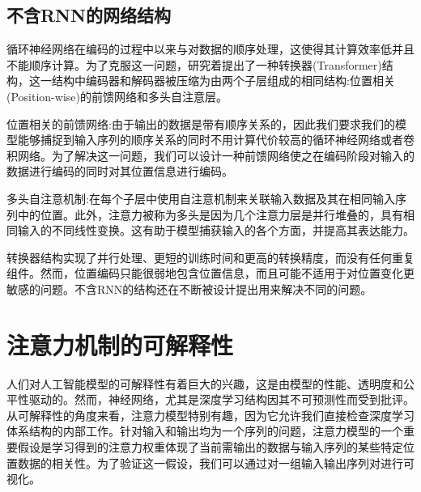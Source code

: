 \documentclass{ctexart}
\begin{document}
\subsection{不含RNN的网络结构}
循环神经网络在编码的过程中以来与对数据的顺序处理，这使得其计算效率低并且不能顺序计算。为了克服这一问题，研究着提出了一种转换器(Transformer)结构，这一结构中编码器和解码器被压缩为由两个子层组成的相同结构:位置相关(Position-wise)的前馈网络和多头自注意层。


位置相关的前馈网络:由于输出的数据是带有顺序关系的，因此我们要求我们的模型能够捕捉到输入序列的顺序关系的同时不用计算代价较高的循环神经网络或者卷积网络。为了解决这一问题，我们可以设计一种前馈网络使之在编码阶段对输入的数据进行编码的同时对其位置信息进行编码。


多头自注意机制:在每个子层中使用自注意机制来关联输入数据及其在相同输入序列中的位置。此外，注意力被称为多头是因为几个注意力层是并行堆叠的，具有相同输入的不同线性变换。这有助于模型捕获输入的各个方面，并提高其表达能力。


转换器结构实现了并行处理、更短的训练时间和更高的转换精度，而没有任何重复组件。然而，位置编码只能很弱地包含位置信息，而且可能不适用于对位置变化更敏感的问题。不含RNN的结构还在不断被设计提出用来解决不同的问题。
\section{注意力机制的可解释性}
人们对人工智能模型的可解释性有着巨大的兴趣，这是由模型的性能、透明度和公平性驱动的。然而，神经网络，尤其是深度学习结构因其不可预测性而受到批评。从可解释性的角度来看，注意力模型特别有趣，因为它允许我们直接检查深度学习体系结构的内部工作。针对输入和输出均为一个序列的问题，注意力模型的一个重要假设是学习得到的注意力权重体现了当前需输出的数据与输入序列的某些特定位置数据的相关性。为了验证这一假设，我们可以通过对一组输入输出序列对进行可视化。
\end{document}
